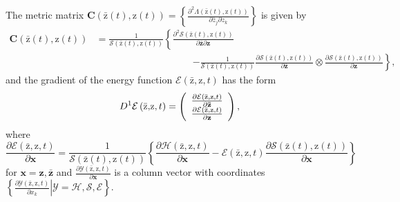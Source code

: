 \documentclass[aps,preprint]{revtex4}%
\begin{document}
The metric matrix $\mathbf{C}\left(  \mathrm{\bar{z}}\left(  t\right)
,\mathrm{z}\left(  t\right)  \right)  =\left\{  \frac{\partial^{2}%
\Lambda\left(  \mathrm{\bar{z}}\left(  t\right)  ,\mathrm{z}\left(  t\right)
\right)  }{\partial\bar{z}_{j}\partial z_{k}}\right\}  $ is given by%
\begin{align}
\mathbf{C}\left(  \mathrm{\bar{z}}\left(  t\right)  ,\mathrm{z}\left(
t\right)  \right)   &  =\frac{1}{\mathcal{S}\left(  \mathrm{\bar{z}}\left(
t\right)  ,\mathrm{z}\left(  t\right)  \right)  }\left\{  \frac{\partial
^{2}\mathcal{S}\left(  \mathrm{\bar{z}}\left(  t\right)  ,\mathrm{z}\left(
t\right)  \right)  }{\partial\mathbf{\bar{z}}\partial\mathbf{z}}\right.
\nonumber\\
&  \qquad\qquad\qquad\qquad\qquad\left.  -\frac{1}{\mathcal{S}\left(
\mathrm{\bar{z}}\left(  t\right)  ,\mathrm{z}\left(  t\right)  \right)  }%
\frac{\partial\mathcal{S}\left(  \mathrm{\bar{z}}\left(  t\right)
,\mathrm{z}\left(  t\right)  \right)  }{\partial\mathbf{\bar{z}}}\otimes
\frac{\partial\mathcal{S}\left(  \mathrm{\bar{z}}\left(  t\right)
,\mathrm{z}\left(  t\right)  \right)  }{\partial\mathbf{z}}\right\}  ,
\end{align}
and the gradient of the energy function $\mathcal{E}\left(  \mathrm{\bar{z}%
}\mathbf{,}\mathrm{z},t\right)  $ has the form%
\begin{equation}
D^{1}\mathcal{E}\left(  \mathrm{\bar{z}}\mathbf{,}\mathrm{z},t\right)
=\left(
\begin{array}
[c]{c}%
\frac{\partial\mathcal{E}\left(  \mathrm{\bar{z}}\mathbf{,}\mathrm{z}%
,t\right)  }{\partial\mathbf{\bar{z}}}\\
\frac{\partial\mathcal{E}\left(  \mathrm{\bar{z}}\mathbf{,}\mathrm{z}%
,t\right)  }{\partial\mathbf{z}}%
\end{array}
\right)  ,
\end{equation}
where
\begin{equation}
\frac{\partial\mathcal{E}\left(  \mathrm{\bar{z}}\mathbf{,}\mathrm{z}%
,t\right)  }{\partial\mathbf{x}}=\frac{1}{\mathcal{S}\left(  \mathrm{\bar{z}%
}\left(  t\right)  ,\mathrm{z}\left(  t\right)  \right)  }\left\{
\frac{\partial\mathcal{H}\left(  \mathrm{\bar{z}}\mathbf{,}\mathrm{z}%
,t\right)  }{\partial\mathbf{x}}-\mathcal{E}\left(  \mathrm{\bar{z}}%
\mathbf{,}\mathrm{z},t\right)  \frac{\partial\mathcal{S}\left(  \mathrm{\bar
{z}}\left(  t\right)  ,\mathrm{z}\left(  t\right)  \right)  }{\partial
\mathbf{x}}\right\}
\end{equation}
for $\mathbf{x=z,\bar{z}}$ and $\frac{\partial\mathcal{Y}\left(
\mathrm{\bar{z}}\mathbf{,}\mathrm{z},t\right)  }{\partial\mathbf{x}}$ is a
column vector with coordinates $\left\{  \left.  \frac{\partial\mathcal{Y}%
\left(  \mathrm{\bar{z}}\mathbf{,}\mathrm{z},t\right)  }{\partial x_{k}%
}\right\vert \mathcal{Y=H},\mathcal{S},\mathcal{E}\right\}  $.
\end{document}
